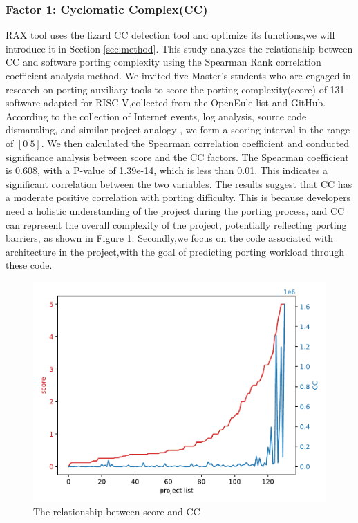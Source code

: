 \documentclass[sigconf,screen,review]{acmart}
\begin{document}
\subsubsection{Factor 1: Cyclomatic Complex(CC)}
\label{sec:factor-1}
RAX tool uses the lizard CC detection tool and optimize its functions,we will introduce it in Section \ref{sec:method}.
This study analyzes the relationship between CC and software porting complexity using the Spearman Rank correlation coefficient analysis method.
We invited five Master's students who are engaged in research on porting auxiliary tools to score the porting complexity(score) of 131 software adapted for RISC-V,collected from the OpenEule list and GitHub.
According to the collection of Internet events, log analysis, source code dismantling, and similar project analogy \cite{liangguanyu2020}, we form a scoring interval in the range of $[0~5]$.
We then calculated the Spearman correlation coefficient and conducted significance analysis between score and the CC factors.
The Spearman coefficient is 0.608, with a P-value of 1.39e-14, which is less than 0.01.
This indicates a significant correlation between the two variables.
The results suggest that CC has a moderate positive correlation with porting difficulty.
This is because developers need a holistic understanding of the project during the porting process, and CC can represent the overall complexity of the project, potentially reflecting porting barriers, as shown in Figure \ref{fig:relationship}.
Secondly,we focus on the code associated with architecture in the project,with the goal of predicting porting workload through these code.

\begin{figure}
  \centering
  \includegraphics[width=\linewidth]{relationship.pdf}
  \caption{The relationship between score and CC}
  \label{fig:relationship}
\end{figure}
\end{document}
